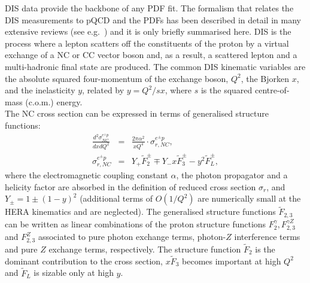 DIS data provide the backbone of any PDF fit.
The for\-ma\-lism that relates the DIS measurements to pQCD and the PDFs has been described
in detail in many extensive reviews (see e.g.~\cite{disbook}) and it is only briefly summarised here.
DIS is the process where a lepton scatters off the constituents of the proton
by a virtual exchange of a NC 
or CC vector boson and, as a result, a scattered lepton and a 
multi-hadronic final state are produced.
The common DIS kinematic variables are the absolute squared four-momentum of 
the exchange boson, $Q^2$, the Bjorken $x$, 
and the inelasticity $y$, related by $y=Q^2/sx$, where $s$ is the squared centre-of-mass (c.o.m.) energy.
\\
%
The NC cross section can be expressed in terms of generalised structure functions:
\begin{eqnarray}
   \frac{d^2\sigma_{NC}^{e^{\pm} p}}{dxdQ^2}&=&\frac{2\pi\alpha^2}{xQ^4}\cdot \sigma_{r,NC}^{e^{\pm} p},\\ 
   \sigma_{r,NC}^{e^{\pm} p}&= &  Y_{+} \tilde F_2^{\pm} \mp Y_{-}x \tilde F_3^{\pm} - y^2 \tilde F_L^{\pm},
\end{eqnarray}
where the electromagnetic coupling constant $\alpha$, the photon propagator and a helicity factor are absorbed in the definition of reduced cross section $\sigma_r$, and  $Y_{\pm} = 1 \pm (1-y)^2$ (additional terms of $O(1/Q^2)$ are numerically small 
at the HERA kinematics and are neglected). 
The generalised structure functions $\tilde F_{2,3}$ 
can be written as linear combinations of the proton structure functions $F_2^{\gamma}, F_{2,3}^{\gamma Z}$ 
and $F_{2,3}^Z$ associated to pure photon exchange terms, photon-$Z$ interference
terms and pure $Z$ exchange terms, respectively. 
The structure function $\tilde F_2$ is the dominant contribution to the cross section, 
$x \tilde F_3$ becomes important at high $Q^2$ and $\tilde F_L$ is sizable 
only at high $y$. 
